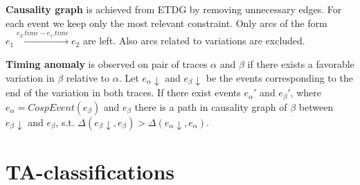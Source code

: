 \textbf{Causality graph} is achieved from ETDG by removing unnecessary edges. For each event we keep only the most relevant constraint. Only arcs of the form $e_1 \xrightarrow{e_2.time - e_1.time} e_2$ are left. Also arcs related to variations are excluded.

\textbf{Timing anomaly} is observed on pair of traces $\alpha$ and $\beta$ if there exists a favorable variation in $\beta$ relative to $\alpha$. Let $e_\alpha\downarrow$ and $e_\beta\downarrow$ be the events corresponding to the end of the variation in both traces. If there exist events $e_\alpha'$ and $e_\beta'$, where $e_\alpha = CospEvent(e_\beta)$ and $e_\beta$ there is a path in causality graph of $\beta$ between $e_\beta\downarrow$ and $e_\beta$, s.t. $\Delta(e_\beta\downarrow,e_\beta) > \Delta(e_\alpha\downarrow,e_\alpha)$.


\section{TA-classifications}

